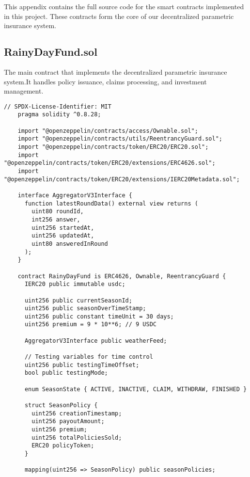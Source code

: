 	This appendix contains the full source code for the smart contracts implemented in this project.
    These contracts form the core of our decentralized parametric insurance system.

	\subsection{RainyDayFund.sol}\label{subsec:rainy-day-fund}
	The main contract that implements the decentralized parametric insurance system.It handles policy issuance, claims processing, and investment management.

	\begin{lstlisting}[style=soliditystyle, caption={RainyDayFund.sol - Main Insurance Contract},label={lst:lstlistingA}]
    // SPDX-License-Identifier: MIT
    pragma solidity ^0.8.28;

    import "@openzeppelin/contracts/access/Ownable.sol";
    import "@openzeppelin/contracts/utils/ReentrancyGuard.sol";
    import "@openzeppelin/contracts/token/ERC20/ERC20.sol";
    import "@openzeppelin/contracts/token/ERC20/extensions/ERC4626.sol";
    import "@openzeppelin/contracts/token/ERC20/extensions/IERC20Metadata.sol";

    interface AggregatorV3Interface {
      function latestRoundData() external view returns (
        uint80 roundId,
        int256 answer,
        uint256 startedAt,
        uint256 updatedAt,
        uint80 answeredInRound
      );
    }

    contract RainyDayFund is ERC4626, Ownable, ReentrancyGuard {
      IERC20 public immutable usdc;

      uint256 public currentSeasonId;
      uint256 public seasonOverTimeStamp;
      uint256 public constant timeUnit = 30 days;
      uint256 premium = 9 * 10**6; // 9 USDC

      AggregatorV3Interface public weatherFeed;

      // Testing variables for time control
      uint256 public testingTimeOffset;
      bool public testingMode;

      enum SeasonState { ACTIVE, INACTIVE, CLAIM, WITHDRAW, FINISHED }

      struct SeasonPolicy {
        uint256 creationTimestamp;
        uint256 payoutAmount;
        uint256 premium;
        uint256 totalPoliciesSold;
        ERC20 policyToken;
      }

      mapping(uint256 => SeasonPolicy) public seasonPolicies;


\end{lstlisting}
